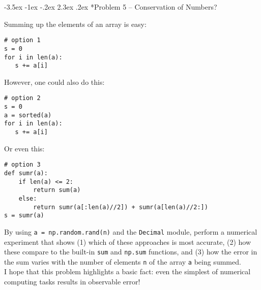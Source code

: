 \documentclass[11pt]{article}
\makeatletter
\renewcommand\section{\@startsection{section}{1}{\z@}%
                                  {-3.5ex \@plus -1ex \@minus -.2ex}%
                                  {2.3ex \@plus.2ex}%
                                  {\normalfont\bfseries}}
\makeatother
\begin{document}
\section*{Problem 5 -- Conservation of Numbers?}

Summing up the elements of an array is easy:
\begin{verbatim}
# option 1
s = 0   
for i in len(a):
   s += a[i]
\end{verbatim}
However, one could also do this:
\begin{verbatim}
# option 2
s = 0   
a = sorted(a)
for i in len(a):
   s += a[i]
\end{verbatim}
Or even this:
\begin{verbatim}
# option 3
def sumr(a):
    if len(a) <= 2:
        return sum(a)
    else:
        return sumr(a[:len(a)//2]) + sumr(a[len(a)//2:])
s = sumr(a)
\end{verbatim}
By using {\tt a = np.random.rand(n)} and the {\tt Decimal} module, perform a numerical experiment that shows (1) which of these approaches is most accurate, (2) how these compare to the built-in {\tt sum} and {\tt np.sum} functions, and (3) how the error in the sum varies with the number of elements {\tt n} of the array {\tt a} being summed. \\

I hope that this problem highlights a basic fact: even the simplest of numerical computing tasks results in observable error!
\end{document}
